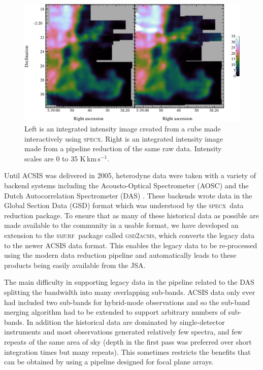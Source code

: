 \documentclass[a4paper,fleqn,usenatbib]{mnras}
\newcommand{\specx}{\textsc{specx}}
\newcommand{\smurf}{\textsc{smurf}}
\newcommand{\gsdacsis}{\textsc{gsd{\footnotesize{2}}acsis}}
\begin{document}
\begin{figure}
\centering
\includegraphics[width=\textwidth]{horsehead}
\caption{Left is an integrated intensity image created from
  a cube made interactively using \specx. Right is an
  integrated intensity image made from a pipeline reduction of the
  same raw data. Intensity scales are 0 to 35 K\,km\,s$^{-1}$.}
\label{fig:hhcmp}
\end{figure}

Until ACSIS was delivered in 2005, heterodyne data were taken with a
variety of backend systems including the Acousto-Optical Spectrometer
(AOSC) and the Dutch Autocorrelation Spectrometer (DAS)
\citep{1986SPIE..598..134B}. These backends wrote data in the
Global Section Data (GSD) format \citep[e.g.,][]{GSD1999,GSD2015} which was
understood by the \specx\ data reduction package. To ensure that as many
of these historical data as possible are made available to the community
in a usable format, we have developed an extension to the \smurf\
package called \gsdacsis, which converts the legacy data to the
newer ACSIS data format. This enables the legacy data to be re-processed using
the modern data reduction pipeline and automatically leads to these
products being easily available from the JSA.

The main difficulty in supporting legacy data in the pipeline related
to the DAS splitting the bandwidth into many overlapping
sub-bands. ACSIS data only ever had included two sub-bands for hybrid-mode
observations and so the sub-band merging algorithm had to be
extended to support arbitrary numbers of sub-bands.  In addition the
historical data are dominated by single-detector instruments and most
observations generated relatively few spectra, and few repeats of the
same area of sky (depth in the first pass was preferred over short
integration times but many repeats). This sometimes
restricts the benefits that can be obtained by using a pipeline
designed for focal plane arrays.
\end{document}
